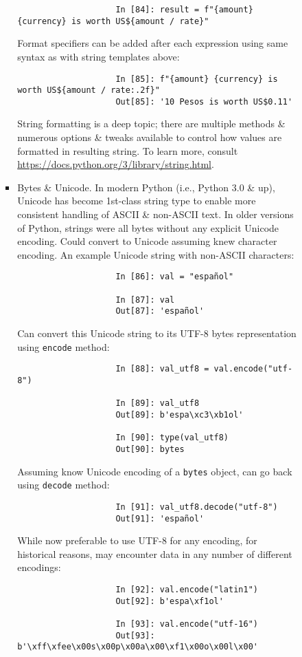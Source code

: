 \documentclass{article}
\begin{document}
\begin{itemize}
\begin{itemize}
\begin{itemize}
\begin{itemize}
\begin{verbatim}
					In [84]: result = f"{amount} {currency} is worth US${amount / rate}"
				\end{verbatim}
				Format specifiers can be added after each expression using same syntax as with string templates above:
				\begin{verbatim}
					In [85]: f"{amount} {currency} is worth US${amount / rate:.2f}"
					Out[85]: '10 Pesos is worth US$0.11'
				\end{verbatim}
				String formatting is a deep topic; there are multiple methods \& numerous options \& tweaks available to control how values are formatted in resulting string. To learn more, consult \url{https://docs.python.org/3/library/string.html}.
				\item {\sf Bytes \& Unicode.} In modern Python (i.e., Python 3.0 \& up), Unicode has become 1st-class string type to enable more consistent handling of ASCII \& non-ASCII text. In older versions of Python, strings were all bytes without any explicit Unicode encoding. Could convert to Unicode assuming knew character encoding. An example Unicode string with non-ASCII characters:
				\begin{verbatim}
					In [86]: val = "español"
					
					In [87]: val
					Out[87]: 'español'
				\end{verbatim}
				Can convert this Unicode string to its UTF-8 bytes representation using {\tt encode} method:
				\begin{verbatim}
					In [88]: val_utf8 = val.encode("utf-8")
					
					In [89]: val_utf8
					Out[89]: b'espa\xc3\xb1ol'
					
					In [90]: type(val_utf8)
					Out[90]: bytes
				\end{verbatim}
				Assuming know Unicode encoding of a {\tt bytes} object, can go back using {\tt decode} method:
				\begin{verbatim}
					In [91]: val_utf8.decode("utf-8")
					Out[91]: 'español'
				\end{verbatim}
				While now preferable to use UTF-8 for any encoding, for historical reasons, may encounter data in any number of different encodings:
				\begin{verbatim}
					In [92]: val.encode("latin1")
					Out[92]: b'espa\xf1ol'
					
					In [93]: val.encode("utf-16")
					Out[93]: b'\xff\xfee\x00s\x00p\x00a\x00\xf1\x00o\x00l\x00'
					

\end{verbatim}
\end{itemize}
\end{itemize}
\end{itemize}
\end{itemize}
\end{document}
